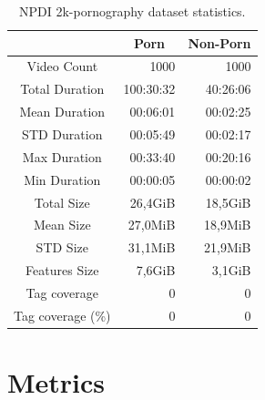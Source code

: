 \begin{table}
\centering
\caption{NPDI 2k-pornography dataset statistics.}
\begin{tabular}{c|r|r} 
\multicolumn{1}{l|}{} & \multicolumn{1}{c|}{Porn} & \multicolumn{1}{c}{Non-Porn}  \\ 
\hline
Video Count           & 1000                      & 1000                           \\ 
\hline
Total Duration        & 100:30:32                 & 40:26:06                       \\ 
\hline
Mean Duration         & 00:06:01                  & 00:02:25                       \\ 
\hline
STD Duration          & 00:05:49                  & 00:02:17                       \\ 
\hline
Max Duration          & 00:33:40                  & 00:20:16                       \\ 
\hline
Min Duration          & 00:00:05                  & 00:00:02                       \\ 
\hline
Total Size            & 26,4GiB                   & 18,5GiB                        \\ 
\hline
Mean Size             & 27,0MiB                   & 18,9MiB                        \\ 
\hline
STD Size              & 31,1MiB                   & 21,9MiB                        \\ 
\hline
Features Size         & 7,6GiB                    & 3,1GiB                         \\ 
\hline
Tag coverage          & 0                      & 0                           \\ 
\hline
Tag coverage (\%)     & 0                       & 0                            \\
\end{tabular}
\label{tab:2kdataset-stats}
\end{table}

\section{Metrics}\label{sec:metrics}


